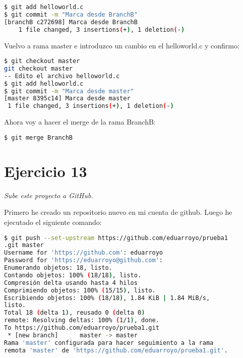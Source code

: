 \begin{lstlisting}[basicstyle=\small,xrightmargin=.10\textwidth,xleftmargin=.10\textwidth,language=bash]
$ git add helloworld.c 
$ git commit -m "Marca desde BranchB"
[branchB c272698] Marca desde BranchB
    1 file changed, 3 insertions(+), 1 deletion(-)
\end{lstlisting}

Vuelvo a rama master e introduzco un cambio en el helloworld.c y confirmo:
\begin{lstlisting}[basicstyle=\small,xrightmargin=.10\textwidth,xleftmargin=.10\textwidth,language=bash]
$ git checkout master
git checkout master
-- Edito el archivo helloworld.c
$ git add helloworld.c
$ git commit -m "Marca desde master"
[master 8395c14] Marca desde master
 1 file changed, 3 insertions(+), 1 deletion(-)
\end{lstlisting}

Ahora voy a hacer el merge de la rama BranchB:
\begin{lstlisting}[basicstyle=\small,xrightmargin=.10\textwidth,xleftmargin=.10\textwidth,language=bash]
$ git merge BranchB
\end{lstlisting}

\section{Ejercicio 13}
\begin{center}
    \parbox{12cm}{\justify\textit{
        Sube este proyecto a GitHub.
    }}
\end{center}
Primero he creado un repositorio nuevo en mi cuenta de github. Luego he ejecutado el siguiente comando:

\begin{lstlisting}[basicstyle=\small,xrightmargin=.10\textwidth,xleftmargin=.10\textwidth,language=bash]
$ git push --set-upstream https://github.com/eduarroyo/prueba1
.git master
Username for 'https://github.com': eduarroyo
Password for 'https://eduarroyo@github.com': 
Enumerando objetos: 18, listo.
Contando objetos: 100% (18/18), listo.
Compresión delta usando hasta 4 hilos
Comprimiendo objetos: 100% (15/15), listo.
Escribiendo objetos: 100% (18/18), 1.84 KiB | 1.84 MiB/s,
listo.
Total 18 (delta 1), reusado 0 (delta 0)
remote: Resolving deltas: 100% (1/1), done.
To https://github.com/eduarroyo/prueba1.git
 * [new branch]      master -> master
Rama 'master' configurada para hacer seguimiento a la rama 
remota 'master' de 'https://github.com/eduarroyo/prueba1.git'.
\end{lstlisting}

